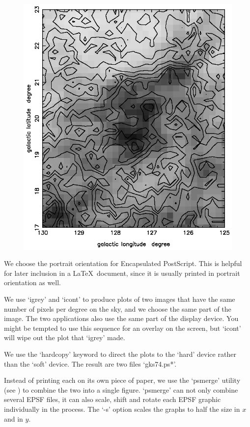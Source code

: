 \begin{figure}[htb]
\begin{center}
\includegraphics{sun86_hard.eps}
\end{center}
\end{figure}

   We choose the portrait orientation for Encapsulated PostScript. This
   is helpful for later inclusion in a \LaTeX\ document, since it is
   usually printed in portrait orientation as well.

   We use `igrey' and `icont' to produce plots of two images that have
   the same number of pixels per degree on the sky, and we choose the
   same part of the image. The two applications also use the same part
   of the display device. You might be tempted to use this sequence for
   an overlay on the screen, but `icont' will wipe out the plot that
   `igrey' made.

   We use the `hardcopy' keyword to direct the plots to the `hard'
   device rather than the `soft' device. The result are two files
   `gks74.ps*'.

   Instead of printing each on its own piece of paper, we use the
   `psmerge' utility (see ) to combine the two
   into a single figure.  `psmerge' can not only combine several EPSF
   files, it can also scale, shift and rotate each EPSF graphic
   individually in the process. The `-s' option scales the graphs to half
   the size in $x$\/ and in $y$.

